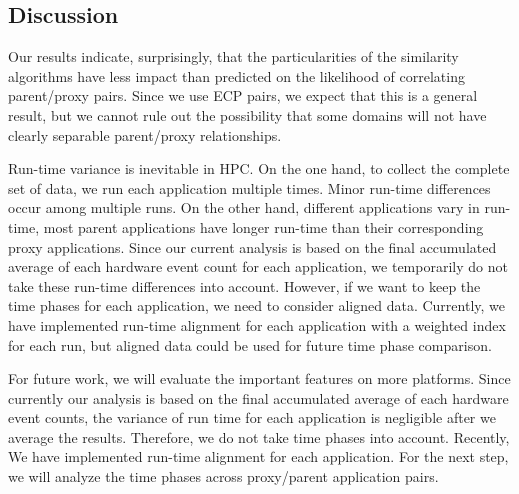 \subsection{Discussion}
Our results indicate, surprisingly, that the particularities of the similarity algorithms have less impact than predicted on the likelihood of correlating parent/proxy pairs.  Since we use ECP pairs, we expect that this is a general result, but we cannot rule out the possibility that some domains will not have clearly separable parent/proxy relationships.

Run-time variance is inevitable in HPC. On the one hand, to collect the complete set of data, we run each application multiple times. Minor run-time differences occur among multiple runs. On the other hand, different applications vary in run-time, \eg most parent applications have longer run-time than their corresponding proxy applications. Since our current analysis is based on the final accumulated average of each hardware event count for each application, we temporarily do not take these run-time differences into account. However, if we want to keep the time phases for each application, we need to consider aligned data. Currently, we have implemented run-time alignment for each application with a weighted index for each run, but aligned data could be used for future time phase comparison. 

For future work, we will evaluate the important features on more platforms. Since currently our analysis is based on the final accumulated average of each hardware event counts, the variance of run time for each application is negligible after we average the results. Therefore, we do not take time phases into account. Recently, We have implemented run-time alignment for each application. For the next step, we will analyze the time phases across proxy/parent application pairs.

